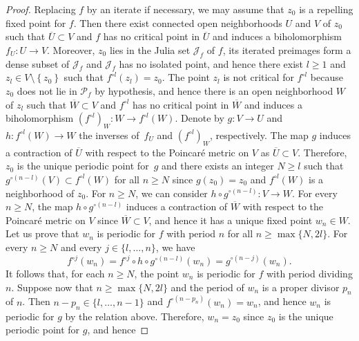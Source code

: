 \documentclass[11pt]{article}
\theoremstyle{plain}
\theoremstyle{definition}
\theoremstyle{remark}
\begin{document}
\begin{proof}
Replacing $f$ by an iterate if necessary, we may assume that $z_{0}$ is a repelling fixed point for $f$. Then there exist connected open neighborhoods $U$ and $V$ of $z_{0}$ such that $\overline{U} \subset V$ and $f$ has no critical point in $\overline{U}$ and induces a biholomorphism $f_{U} \colon U \to V$. Moreover, $z_{0}$ lies in the Julia set $\mathcal{J}_{f}$ of $f$, its iterated preimages form a dense subset of $\mathcal{J}_{f}$ and $\mathcal{J}_{f}$ has no isolated point, and hence there exist $l \geq 1$ and $z_{l} \in V \setminus \left\lbrace z_{0} \right\rbrace$ such that $f^{\circ l}\left(z_{l} \right) = z_{0}$. The point $z_{l}$ is not critical for $f^{\circ l}$ because $z_{0}$ does not lie in $\mathcal{P}_{f}$ by hypothesis, and hence there is an open neighborhood $W$ of $z_{l}$ such that $\overline{W} \subset V$ and $f^{\circ l}$ has no critical point in $\overline{W}$ and induces a biholomorphism $\left(f^{\circ l} \right)_{W} \colon W \to f^{\circ l}(W)$. Denote by $g \colon V \to U$ and $h \colon f^{\circ l}(W) \to W$ the inverses of~$f_{U}$ and $\left(f^{\circ l} \right)_{W}$, respectively. The map $g$ induces a contraction of $\overline{U}$ with respect to the Poincaré metric on $V$ as $\overline{U} \subset V$. Therefore, $z_{0}$ is the unique periodic point for~$g$ and there exists an integer $N \geq l$ such that $g^{\circ (n -l)}(V) \subset f^{\circ l}(W)$ for all $n \geq N$ since $g(z_{0}) = z_{0}$ and $f^{\circ l}(W)$ is a neighborhood of $z_{0}$. For $n \geq N$, we can consider $h \circ g^{\circ (n -l)} \colon V \to W$. For every $n \geq N$, the map $h \circ g^{\circ (n -l)}$ induces a contraction of $\overline{W}$ with respect to the Poincaré metric on $V$ since $\overline{W} \subset V$, and hence it has a unique fixed point $w_{n} \in W$. Let us prove that $w_{n}$ is periodic for $f$ with period $n$ for all $n \geq \max\lbrace N, 2 l \rbrace$. For every $n \geq N$ and every $j \in \lbrace l, \dotsc, n \rbrace$, we have
\[
f^{\circ j}(w_{n}) = f^{\circ j} \circ h \circ g^{\circ (n -l)}(w_{n}) = g^{\circ (n -j)}(w_{n}).
\]
It follows that, for each $n \geq N$, the point $w_{n}$ is periodic for $f$ with period dividing $n$. Suppose now that $n \geq \max\lbrace N, 2 l \rbrace$ and the period of $w_{n}$ is a proper divisor $p_{n}$ of $n$. Then $n -p_{n} \in \lbrace l, \dotsc, n -1 \rbrace$ and $f^{\circ \left(n -p_{n} \right)}(w_{n}) = w_{n}$, and hence $w_{n}$ is periodic for $g$ by the relation above. Therefore, $w_{n} = z_{0}$ since $z_{0}$ is the unique periodic point for $g$, and hence

\end{proof}
\end{document}
